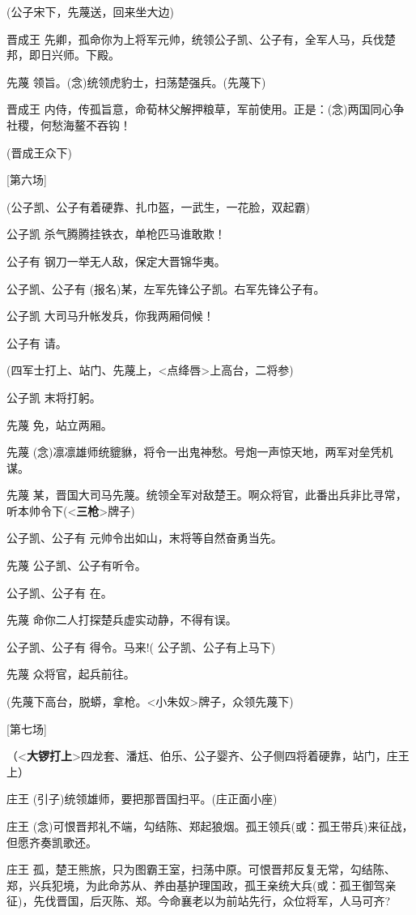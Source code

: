(公子宋下，先蔑送，回来坐大边)

晋成王
先卿，孤命你为上将军元帅，统领公子凯、公子有，全军人马，兵伐楚邦，即日兴师。下殿。

先蔑 领旨。(念)统领虎豹士，扫荡楚强兵。(先蔑下)

晋成王
内侍，传孤旨意，命荀林父解押粮草，军前使用。正是：(念)两国同心争社稷，何愁海鳌不吞钩！

(晋成王众下)

{[}第六场{]}

(公子凯、公子有着硬靠、扎巾盔，一武生，一花脸，双起霸)

公子凯 杀气腾腾挂铁衣，单枪匹马谁敢欺！

公子有 钢刀一举无人敌，保定大晋锦华夷。

公子凯、公子有 (报名)某，左军先锋公子凯。右军先锋公子有。

公子凯 大司马升帐发兵，你我两厢伺候！

公子有 请。

(四军士打上、站门、先蔑上，\textless{}点绛唇\textgreater{}上高台，二将参)

公子凯 末将打躬。

先蔑 免，站立两厢。

先蔑
(念)凛凛雄师统貔貅，将令一出鬼神愁。号炮一声惊天地，两军对垒凭机谋。

先蔑
某，晋国大司马先蔑。统领全军对敌楚王。啊众将官，此番出兵非比寻常，听本帅令下(\textless{}\textbf{三枪}\textgreater{}牌子)

公子凯、公子有 元帅令出如山，末将等自然奋勇当先。

先蔑 公子凯、公子有听令。

公子凯、公子有 在。

先蔑 命你二人打探楚兵虚实动静，不得有误。

公子凯、公子有 得令。马来!( 公子凯、公子有上马下)

先蔑 众将官，起兵前往。

(先蔑下高台，脱蟒，拿枪。\textless{}小朱奴\textgreater{}牌子，众领先蔑下)

{[}第七场{]}

（\textless{}\textbf{大锣打上}\textgreater{}四龙套、潘尪、伯乐、公子婴齐、公子侧四将着硬靠，站门，庄王上）

庄王 (引子)统领雄师，要把那晋国扫平。(庄正面小座)

庄王
(念)可恨晋邦礼不端，勾结陈、郑起狼烟。孤王领兵(或：孤王带兵)来征战，但愿齐奏凯歌还。

庄王
孤，楚王熊旅，只为图霸王室，扫荡中原。可恨晋邦反复无常，勾结陈、郑，兴兵犯境，为此命苏从、养由基护理国政，孤王亲统大兵(或：孤王御驾亲征)，先伐晋国，后灭陈、郑。今命襄老以为前站先行，众位将军，人马可齐?

